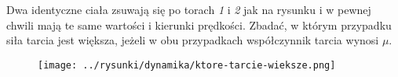 Dwa identyczne ciała zsuwają się po torach \emph{1} i \emph{2} jak na rysunku i w pewnej chwili mają te same wartości i kierunki prędkości. Zbadać, w którym przypadku siła tarcia jest większa, jeżeli w obu przypadkach współczynnik tarcia wynosi \emph{$\mu$}.

\begin{figure}[H]
	\centering
	\texttt{[image: ../rysunki/dynamika/ktore-tarcie-wieksze.png]}
\end{figure}

